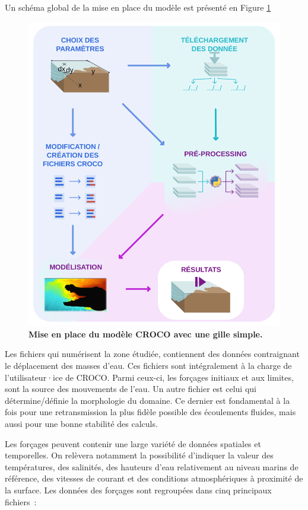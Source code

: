 \documentclass[10pt,a4paper,titlepage]{article}
\begin{document}
    Un schéma global de la mise en place du modèle est présenté en Figure \ref{fig:workflow_simple}
    \begin{figure}[h!]
        \centering
        \includegraphics[scale=0.35]{../images/workflow/mise_en_place_generale_croco.pdf}
        \caption{\textbf{Mise en place du modèle CROCO avec une gille simple.}}
        \label{fig:workflow_simple}
    \end{figure}
    
    Les fichiers qui numérisent la zone étudiée, contiennent des données contraignant le déplacement des masses d'eau.
    Ces fichiers sont intégralement à la charge de l'utilisateur·ice de CROCO.
    Parmi ceux-ci, les forçages initiaux et aux limites, sont la source des mouvements de l'eau. Un autre fichier est celui qui détermine/définie la morphologie du domaine. Ce dernier est fondamental à la fois pour une retransmission la plus fidèle possible des écoulements fluides, mais aussi pour une bonne stabilité des calculs.
    
    Les forçages peuvent contenir une large variété de données spatiales et temporelles.
    On relèvera notamment la possibilité d'indiquer la valeur des températures, des salinités, des hauteurs d'eau relativement au niveau marins de référence, des vitesses de courant et des conditions atmosphériques à proximité de la surface.
    Les données des forçages sont regroupées dans cinq principaux fichiers~:
    
\end{document}
